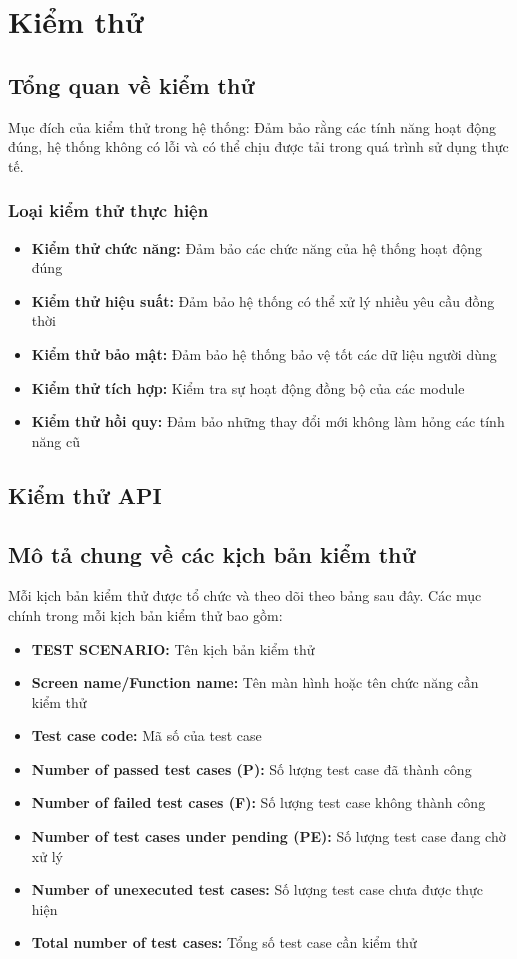 \section{Kiểm thử}

\subsection{Tổng quan về kiểm thử}

Mục đích của kiểm thử trong hệ thống: Đảm bảo rằng các tính năng hoạt động đúng, hệ thống không có lỗi và có thể chịu được tải trong quá trình sử dụng thực tế.

\subsubsection{Loại kiểm thử thực hiện}
\begin{itemize}
    \item \textbf{Kiểm thử chức năng:} Đảm bảo các chức năng của hệ thống hoạt động đúng
    \item \textbf{Kiểm thử hiệu suất:} Đảm bảo hệ thống có thể xử lý nhiều yêu cầu đồng thời
    \item \textbf{Kiểm thử bảo mật:} Đảm bảo hệ thống bảo vệ tốt các dữ liệu người dùng
    \item \textbf{Kiểm thử tích hợp:} Kiểm tra sự hoạt động đồng bộ của các module
    \item \textbf{Kiểm thử hồi quy:} Đảm bảo những thay đổi mới không làm hỏng các tính năng cũ
\end{itemize}

\subsection{Kiểm thử API}

\subsection{Mô tả chung về các kịch bản kiểm thử}

Mỗi kịch bản kiểm thử được tổ chức và theo dõi theo bảng sau đây. Các mục chính trong mỗi kịch bản kiểm thử bao gồm:
\begin{itemize}
    \item \textbf{TEST SCENARIO:} Tên kịch bản kiểm thử
    \item \textbf{Screen name/Function name:} Tên màn hình hoặc tên chức năng cần kiểm thử
    \item \textbf{Test case code:} Mã số của test case
    \item \textbf{Number of passed test cases (P):} Số lượng test case đã thành công
    \item \textbf{Number of failed test cases (F):} Số lượng test case không thành công
    \item \textbf{Number of test cases under pending (PE):} Số lượng test case đang chờ xử lý
    \item \textbf{Number of unexecuted test cases:} Số lượng test case chưa được thực hiện
    \item \textbf{Total number of test cases:} Tổng số test case cần kiểm thử
\end{itemize}

